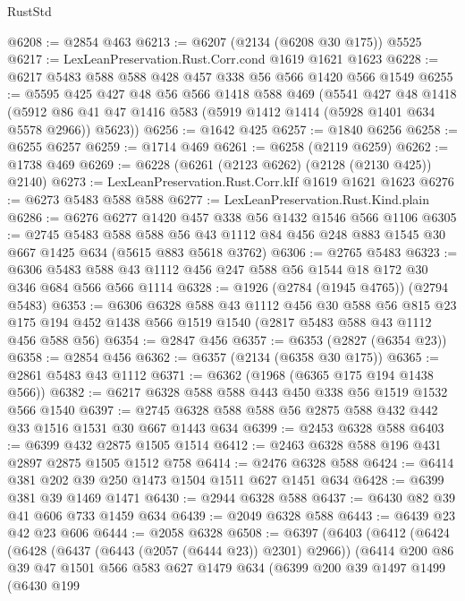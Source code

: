 \begin{lexlean}{RustStd}
\begin{coremodule}
@6208 := @2854 @463
@6213 := @6207 (@2134 (@6208 @30 @175)) @5525
@6217 := LexLeanPreservation.Rust.Corr.cond @1619 @1621 @1623
@6228 := @6217 @5483 @588 @588 @428 @457 @338 @56 @566 @1420 @566 @1549
@6255 := @5595
    @425
    @427
    @48
    @56
    @566
    @1418
    @588
    @469
    (@5541
      @427
      @48
      @1418
      (@5912 @86 @41 @47 @1416 @583 (@5919 @1412 @1414 (@5928 @1401 @634 @5578 @2966)) @5623))
@6256 := @1642 @425
@6257 := @1840 @6256
@6258 := @6255 @6257
@6259 := @1714 @469
@6261 := @6258 (@2119 @6259)
@6262 := @1738 @469
@6269 := @6228 (@6261 (@2123 @6262) (@2128 (@2130 @425)) @2140)
@6273 := LexLeanPreservation.Rust.Corr.kIf @1619 @1621 @1623
@6276 := @6273 @5483 @588 @588
@6277 := LexLeanPreservation.Rust.Kind.plain
@6286 := @6276 @6277 @1420 @457 @338 @56 @1432 @1546 @566 @1106
@6305 := @2745
    @5483
    @588
    @588
    @56
    @43
    @1112
    @84
    @456
    @248
    @883
    @1545
    @30
    @667
    @1425
    @634
    (@5615 @883 @5618 @3762)
@6306 := @2765 @5483
@6323 := @6306 @5483 @588 @43 @1112 @456 @247 @588 @56 @1544 @18 @172 @30 @346 @684 @566 @566 @1114
@6328 := @1926 (@2784 (@1945 @4765)) (@2794 @5483)
@6353 := @6306
    @6328
    @588
    @43
    @1112
    @456
    @30
    @588
    @56
    @815
    @23
    @175
    @194
    @452
    @1438
    @566
    @1519
    @1540
    (@2817 @5483 @588 @43 @1112 @456 @588 @56)
@6354 := @2847 @456
@6357 := @6353 (@2827 (@6354 @23))
@6358 := @2854 @456
@6362 := @6357 (@2134 (@6358 @30 @175))
@6365 := @2861 @5483 @43 @1112
@6371 := @6362 (@1968 (@6365 @175 @194 @1438 @566))
@6382 := @6217 @6328 @588 @588 @443 @450 @338 @56 @1519 @1532 @566 @1540
@6397 := @2745 @6328 @588 @588 @56 @2875 @588 @432 @442 @33 @1516 @1531 @30 @667 @1443 @634
@6399 := @2453 @6328 @588
@6403 := @6399 @432 @2875 @1505 @1514
@6412 := @2463 @6328 @588 @196 @431 @2897 @2875 @1505 @1512 @758
@6414 := @2476 @6328 @588
@6424 := @6414 @381 @202 @39 @250 @1473 @1504 @1511 @627 @1451 @634
@6428 := @6399 @381 @39 @1469 @1471
@6430 := @2944 @6328 @588
@6437 := @6430 @82 @39 @41 @606 @733 @1459 @634
@6439 := @2049 @6328 @588
@6443 := @6439 @23 @42 @23 @606
@6444 := @2058 @6328
@6508 := @6397
    (@6403
      (@6412
        (@6424
          (@6428 (@6437 (@6443 (@2057 (@6444 @23)) @2301) @2966))
          (@6414
            @200
            @86
            @39
            @47
            @1501
            @566
            @583
            @627
            @1479
            @634
            (@6399
              @200
              @39
              @1497
              @1499
              (@6430
                @199

\end{coremodule}
\end{lexlean}
